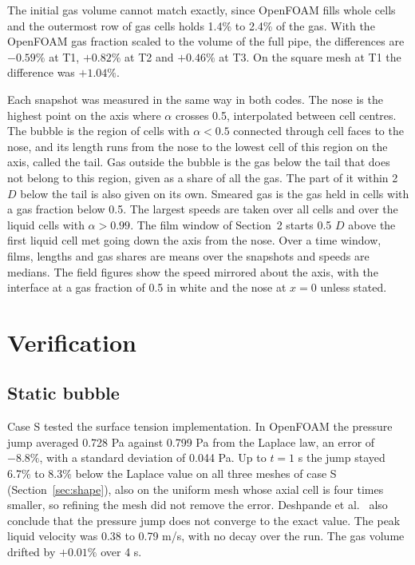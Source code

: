 \documentclass[11pt,a4paper]{article}
\begin{document}
The initial gas volume cannot match exactly, since OpenFOAM fills whole cells and the outermost row of gas cells holds 1.4\% to 2.4\% of the gas. With the OpenFOAM gas fraction scaled to the volume of the full pipe, the differences are $-0.59\%$ at T1, $+0.82\%$ at T2 and $+0.46\%$ at T3. On the square mesh at T1 the difference was $+1.04\%$.

Each snapshot was measured in the same way in both codes. The nose is the highest point on the axis where $\alpha$ crosses 0.5, interpolated between cell centres. The bubble is the region of cells with $\alpha < 0.5$ connected through cell faces to the nose, and its length runs from the nose to the lowest cell of this region on the axis, called the tail. Gas outside the bubble is the gas below the tail that does not belong to this region, given as a share of all the gas. The part of it within 2 $D$ below the tail is also given on its own. Smeared gas is the gas held in cells with a gas fraction below 0.5. The largest speeds are taken over all cells and over the liquid cells with $\alpha > 0.99$. The film window of Section~2 starts 0.5 $D$ above the first liquid cell met going down the axis from the nose. Over a time window, films, lengths and gas shares are means over the snapshots and speeds are medians. The field figures show the speed mirrored about the axis, with the interface at a gas fraction of 0.5 in white and the nose at $x = 0$ unless stated.

\section{Verification}

\subsection{Static bubble}

Case S tested the surface tension implementation. In OpenFOAM the pressure jump averaged 0.728 Pa against 0.799 Pa from the Laplace law, an error of $-8.8\%$, with a standard deviation of 0.044 Pa. Up to $t = 1$ s the jump stayed 6.7\% to 8.3\% below the Laplace value on all three meshes of case S (Section~\ref{sec:shape}), also on the uniform mesh whose axial cell is four times smaller, so refining the mesh did not remove the error. Deshpande et al.\ \cite{deshpande2012evaluating} also conclude that the pressure jump does not converge to the exact value. The peak liquid velocity was 0.38 to 0.79 m/s, with no decay over the run. The gas volume drifted by $+0.01\%$ over 4 s.
\end{document}
